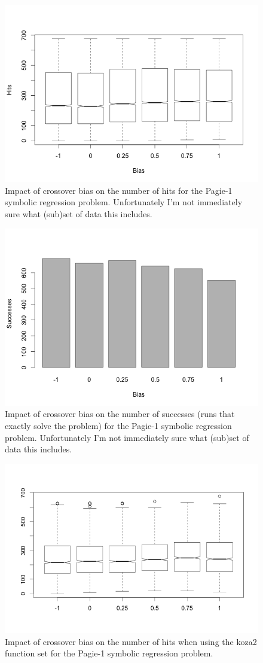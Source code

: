 \documentclass{sig-alternate}
\begin{document}
\begin{figure}
\centering
\includegraphics[width=0.45 \textwidth]{Plots/Pagie-1_Hits_vs_Bias.png}
\caption{Impact of crossover bias on the number of hits for the Pagie-1 symbolic regression problem. 
Unfortunately I'm not immediately sure what (sub)set of data this includes.}
\label{fig:Pagie1Hits}
\end{figure}

\begin{figure}
\centering
\includegraphics[width=0.45 \textwidth]{Plots/Pagie-1_Successes_vs_Bias.png}
\caption{Impact of crossover bias on the number of successes (runs that exactly solve the problem) for the 
Pagie-1 symbolic regression problem. Unfortunately I'm not immediately sure what (sub)set of data this 
includes.}
\label{fig:Pagie1Successes}
\end{figure}

\begin{figure}
\centering
\includegraphics[width=0.45 \textwidth]{Plots/Pagie-1-koza2_no_Tarpeian.png}
\caption{Impact of crossover bias on the number of hits when using the koza2 function set for the Pagie-1 
symbolic regression problem.}
\label{fig:Pagie1Koza2}
\end{figure}
\end{document}
